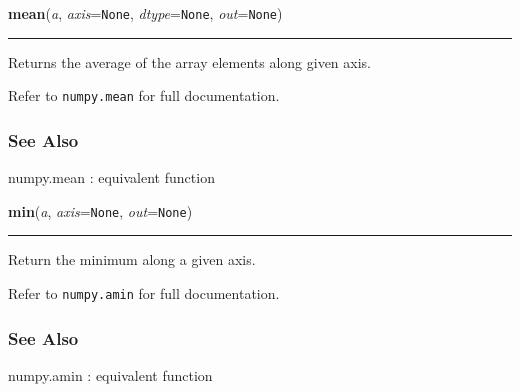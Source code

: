     \begin{boxedminipage}{\textwidth}

    \raggedright \textbf{mean}(\textit{a}, \textit{axis}=\texttt{None}, \textit{dtype}=\texttt{None}, \textit{out}=\texttt{None})

    \vspace{-1.5ex}

    \rule{\textwidth}{0.5\fboxrule}

Returns the average of the array elements along given axis.

Refer to \texttt{numpy.mean} for full documentation.



\hypertarget{see-also}{}
\subsubsection*{See Also}

numpy.mean : equivalent function
    \vspace{1ex}

    \end{boxedminipage}

    \label{numpy:ndarray:min}

    \vspace{0.5ex}

    \begin{boxedminipage}{\textwidth}

    \raggedright \textbf{min}(\textit{a}, \textit{axis}=\texttt{None}, \textit{out}=\texttt{None})

    \vspace{-1.5ex}

    \rule{\textwidth}{0.5\fboxrule}

Return the minimum along a given axis.

Refer to \texttt{numpy.amin} for full documentation.



\hypertarget{see-also}{}
\subsubsection*{See Also}

numpy.amin : equivalent function
    \vspace{1ex}

    \end{boxedminipage}

